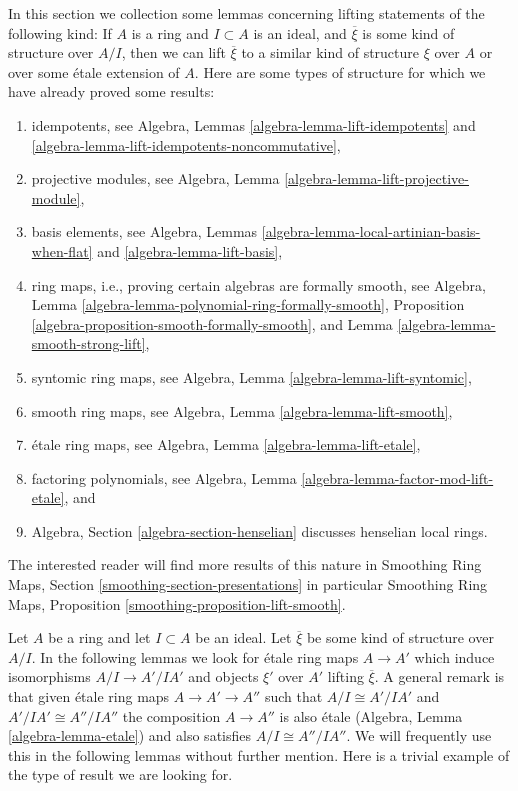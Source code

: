 \noindent
In this section we collection some lemmas concerning lifting
statements of the following kind: If $A$ is a ring and $I \subset A$
is an ideal, and $\overline{\xi}$ is some kind of structure over
$A/I$, then we can lift $\overline{\xi}$ to a similar kind of structure
$\xi$ over $A$ or over some \'etale extension of $A$. Here are some types
of structure for which we have already proved some results:
\begin{enumerate}
\item idempotents, see
Algebra, Lemmas \ref{algebra-lemma-lift-idempotents} and
\ref{algebra-lemma-lift-idempotents-noncommutative},
\item projective modules, see
Algebra, Lemma \ref{algebra-lemma-lift-projective-module},
\item basis elements, see
Algebra, Lemmas \ref{algebra-lemma-local-artinian-basis-when-flat} and
\ref{algebra-lemma-lift-basis},
\item ring maps, i.e., proving certain algebras are formally smooth, see
Algebra, Lemma \ref{algebra-lemma-polynomial-ring-formally-smooth},
Proposition \ref{algebra-proposition-smooth-formally-smooth}, and
Lemma \ref{algebra-lemma-smooth-strong-lift},
\item syntomic ring maps, see
Algebra, Lemma \ref{algebra-lemma-lift-syntomic},
\item smooth ring maps, see
Algebra, Lemma \ref{algebra-lemma-lift-smooth},
\item \'etale ring maps, see
Algebra, Lemma \ref{algebra-lemma-lift-etale},
\item factoring polynomials, see
Algebra, Lemma \ref{algebra-lemma-factor-mod-lift-etale}, and
\item Algebra, Section \ref{algebra-section-henselian} discusses henselian
local rings.
\end{enumerate}
The interested reader will find more results of this nature in
Smoothing Ring Maps, Section \ref{smoothing-section-presentations}
in particular
Smoothing Ring Maps, Proposition \ref{smoothing-proposition-lift-smooth}.

\medskip\noindent
Let $A$ be a ring and let $I \subset A$ be an ideal. Let $\overline{\xi}$
be some kind of structure over $A/I$. In the following lemmas we look for
\'etale ring maps $A \to A'$ which induce isomorphisms $A/I \to A'/IA'$
and objects $\xi'$ over $A'$ lifting $\overline{\xi}$. A general remark is
that given \'etale ring maps $A \to A' \to A''$ such that
$A/I \cong A'/IA'$ and $A'/IA' \cong A''/IA''$ the composition
$A \to A''$ is also \'etale (Algebra, Lemma \ref{algebra-lemma-etale})
and also satisfies $A/I \cong A''/IA''$.
We will frequently use this in the following lemmas without further mention.
Here is a trivial example of the type of result we are looking for.

